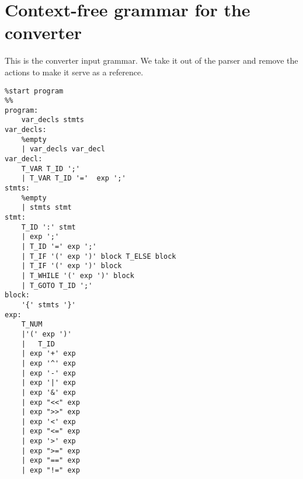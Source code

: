 \newpage
\appendix

\chapter{Context-free grammar for the converter}
	\label{AP_01}
This is the converter input grammar. We take it out of the parser and remove the actions to make it serve as a reference.

\begin{verbatim}
%start program
%%
program:
    var_decls stmts
var_decls: 
    %empty 
    | var_decls var_decl 
var_decl: 
    T_VAR T_ID ';' 
    | T_VAR T_ID '='  exp ';' 
stmts: 
    %empty 
    | stmts stmt 	
stmt: 
    T_ID ':' stmt
    | exp ';' 
    | T_ID '=' exp ';' 
    | T_IF '(' exp ')' block T_ELSE block 
    | T_IF '(' exp ')' block 
    | T_WHILE '(' exp ')' block 
    | T_GOTO T_ID ';' 
block: 
    '{' stmts '}' 
exp:
    T_NUM 
    |'(' exp ')' 
    |	T_ID 
    | exp '+' exp 
    | exp '^' exp 
    | exp '-' exp 
    | exp '|' exp 
    | exp '&' exp 
    | exp "<<" exp 
    | exp ">>" exp 
    | exp '<' exp 
    | exp "<=" exp 
    | exp '>' exp 
    | exp ">=" exp 
    | exp "==" exp 
    | exp "!=" exp
\end{verbatim}

